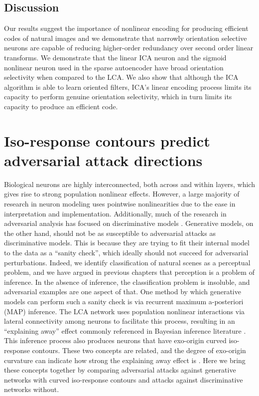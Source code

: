 \subsection{Discussion}
Our results suggest the importance of nonlinear encoding for producing efficient codes of natural images and we demonstrate that narrowly orientation selective neurons are capable of reducing higher-order redundancy over second order linear transforms.
We demonstrate that the linear ICA neuron and the sigmoid nonlinear neuron used in the sparse autoencoder have broad orientation selectivity when compared to the LCA.
We also show that although the ICA algorithm is able to learn oriented filters, ICA's linear encoding process limits its capacity to perform genuine orientation selectivity, which in turn limits its capacity to produce an efficient code.


\section{Iso-response contours predict adversarial attack directions}\label{sec:ch4_adv_defense}
Biological neurons are highly interconnected, both across and within layers, which gives rise to strong population nonlinear effects.
However, a large majority of research in neuron modeling uses pointwise nonlinearities due to the ease in interpretation and implementation.
Additionally, much of the research in adversarial analysis has focused on discriminative models \parencite{ng2002discriminative}.
Generative models, on the other hand, should not be as susceptible to adversarial attacks as discriminative models.
This is because they are trying to fit their internal model to the data as a ``sanity check'', which ideally should not succeed for adversarial perturbations.
Indeed, we identify classification of natural scenes as a perceptual problem, and we have argued in previous chapters that perception is a problem of inference.
In the absence of inference, the classification problem is insoluble, and adversarial examples are one aspect of that.
One method by which generative models can perform such a sanity check is via recurrent maximum a-posteriori (MAP) inference.
The LCA network uses population nonlinear interactions via lateral connectivity among neurons to facilitate this process, resulting in an ``explaining away'' effect commonly referenced in Bayesian inference literature \parencite{olshausen2013perception}.
This inference process also produces neurons that have exo-origin curved iso-response contours.
These two concepts are related, and the degree of exo-origin curvature can indicate how strong the explaining away effect is \parencite{vilankar2017selectivity}.
Here we bring these concepts together by comparing adversarial attacks against generative networks with curved iso-response contours and attacks against discriminative networks without.


